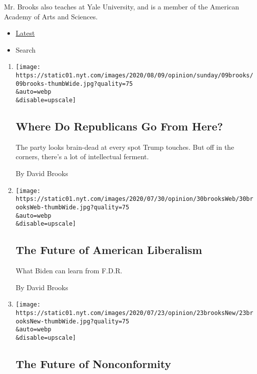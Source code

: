 Mr. Brooks also teaches at Yale University, and is a member of the
American Academy of Arts and Sciences.

\begin{itemize}
\tightlist
\item
  \protect\hyperlink{stream-panel}{Latest}
\item
  Search
\end{itemize}

\begin{enumerate}
\def\labelenumi{\arabic{enumi}.}
\item
  \href{/2020/08/07/opinion/sunday/republican-party-trump-2020.html}{}

  \texttt{[image: https://static01.nyt.com/images/2020/08/09/opinion/sunday/09brooks/09brooks-thumbWide.jpg?quality=75\\\&auto=webp\\\&disable=upscale]}

  \hypertarget{where-do-republicans-go-from-here}{%
  \subsection{Where Do Republicans Go From
  Here?}\label{where-do-republicans-go-from-here}}

  The party looks brain-dead at every spot Trump touches. But off in the
  corners, there's a lot of intellectual ferment.

  By David Brooks
\item
  \href{/2020/07/30/opinion/biden-fdr.html}{}

  \texttt{[image: https://static01.nyt.com/images/2020/07/30/opinion/30brooksWeb/30brooksWeb-thumbWide.jpg?quality=75\\\&auto=webp\\\&disable=upscale]}

  \hypertarget{the-future-of-american-liberalism}{%
  \subsection{The Future of American
  Liberalism}\label{the-future-of-american-liberalism}}

  What Biden can learn from F.D.R.

  By David Brooks
\item
  \href{/2020/07/23/opinion/substack-newsletters-writers.html}{}

  \texttt{[image: https://static01.nyt.com/images/2020/07/23/opinion/23brooksNew/23brooksNew-thumbWide.jpg?quality=75\\\&auto=webp\\\&disable=upscale]}

  \hypertarget{the-future-of-nonconformity}{%
  \subsection{The Future of
  Nonconformity}\label{the-future-of-nonconformity}}


\end{enumerate}
